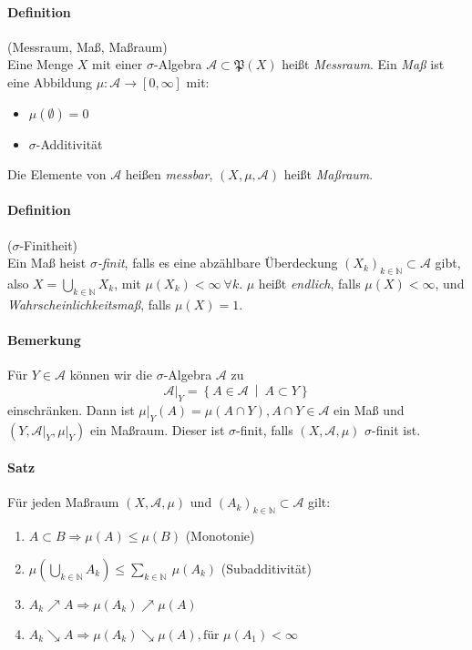 \documentclass[12pt,a4paper,fleqn]{article}
\def\set#1{{\left\{ #1 \right\}}}
\def\Mid{\ \middle|\ }
\begin{document}
\paragraph{Definition}(Messraum, Maß, Maßraum)\\
Eine Menge $X$ mit einer $\sigma$-Algebra $\mathcal{A} \subset \mathfrak{P}(X)$ heißt \textit{Messraum}. Ein \textit{Maß} ist eine Abbildung $\mu\colon \mathcal{A} \rightarrow [0, \infty]$ mit:
\begin{itemize}
\item $\mu (\emptyset) = 0$
\item $\sigma$-Additivität
\end{itemize}
Die Elemente von $\mathcal{A}$ heißen \textit{messbar}, $(X, \mu, \mathcal{A})$ heißt \textit{Maßraum}.

\paragraph{Definition}($\sigma$-Finitheit)\\
Ein Maß heist $\sigma$\textit{-finit}, falls es eine abzählbare Überdeckung $(X_k)_{k \in \mathbb{N}} \subset \mathcal{A}$ gibt, also $X = \bigcup_{k \in \mathbb{N}} X_k$, mit $\mu (X_k) < \infty\ \forall k$. $\mu$ heißt \textit{endlich}, falls $\mu (X) < \infty$, und \textit{Wahrscheinlichkeitsmaß}, falls $\mu (X) =1$.

\paragraph{Bemerkung} Für $Y \in \mathcal{A}$ können wir die $\sigma$-Algebra $\mathcal{A}$ zu 
\begin{displaymath}
\mathcal{A}\vert_Y = \set{A \in \mathcal{A} \Mid A \subset Y}
\end{displaymath}
einschränken. Dann ist $\mu{\vert _Y} (A) = \mu (A\cap Y), A\cap Y \in \mathcal{A}$ ein Maß und $(Y, \mathcal{A}{\vert _Y}, \mu{\vert_Y})$ ein Maßraum.
Dieser ist $\sigma$-finit, falls $(X, \mathcal{A}, \mu)$ $\sigma$-finit ist.

\paragraph{Satz} Für jeden Maßraum $(X, \mathcal{A}, \mu)$ und $(A_k)_{k \in \mathbb{N}} \subset\mathcal{A}$ gilt:
\begin{enumerate}
\item$A \subset B \Rightarrow \mu (A) \leq \mu(B)$ (Monotonie)
\item$\mu(\bigcup_{k \in \mathbb{N}}A_k) \leq \sum_{k \in \mathbb{N}}\  \mu (A_k)$ (Subadditivität)
\item$A_k \nearrow A \Rightarrow \mu(A_k) \nearrow \mu(A)$
\item$A_k \searrow A \Rightarrow \mu(A_k) \searrow \mu(A), \text{für } \mu(A_1) <\infty$
\end{enumerate}
\end{document}
